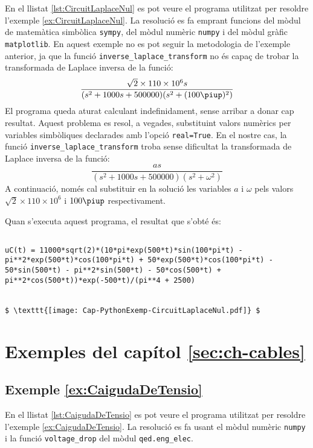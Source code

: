 En el llistat \vref{lst:CircuitLaplaceNul} es pot veure el programa utilitzat per resoldre l'exemple \vref{ex:CircuitLaplaceNul}. La resolució es fa emprant funcions del mòdul de matemàtica simbòlica \texttt{sympy}, del mòdul numèric \texttt{numpy} i del mòdul gràfic  \texttt{matplotlib}. 
En aquest exemple no es pot seguir la metodologia de l'exemple anterior, ja que la funció  \texttt{inverse\_laplace\_transform} no és capaç de trobar la transformada de Laplace inversa de la funció: 
\[
\frac{\sqrt{2}\times 110\times 10^6 s}{(s^2 + 1000 s + 500000)(s^2 + (100\piup)^2)}
\]
El programa queda aturat calculant indefinidament, sense arribar a donar cap resultat.  Aquest problema es resol, a vegades, substituint valors numèrics per variables simbòliques declarades amb l'opció \texttt{real=True}. En el nostre cas, la funció \texttt{inverse\_laplace\_transform} troba sense dificultat la transformada de Laplace inversa de la funció:
\[
\frac{a s}{(s^2 + 1000 s + 500000)(s^2 + \omega^2)}
\]
A continuació, només cal substituir en la solució les variables $a$ i $\omega$ pels valors $\sqrt{2}\times 110\times 10^6$ i $100\piup$ respectivament.





Quan s'executa aquest programa, el resultat que s'obté és:
\lstset{
	language=,
	numbers=none,
	frame=none
}
\begin{lstlisting}[mathescape=true]
	
uC(t) = 11000*sqrt(2)*(10*pi*exp(500*t)*sin(100*pi*t) - pi**2*exp(500*t)*cos(100*pi*t) + 50*exp(500*t)*cos(100*pi*t) - 50*sin(500*t) - pi**2*sin(500*t) - 50*cos(500*t) + pi**2*cos(500*t))*exp(-500*t)/(pi**4 + 2500)


$ \texttt{[image: Cap-PythonExemp-CircuitLaplaceNul.pdf]} $
\end{lstlisting} 



\section{Exemples del capítol \ref*{sec:ch-cables}}

\hypertarget{exemple:CaigudaDeTensio}{\subsection{Exemple \ref*{ex:CaigudaDeTensio} \CaigudaDeTensio}}
En el llistat \vref{lst:CaigudaDeTensio} es pot veure el programa utilitzat per resoldre l'exemple \vref{ex:CaigudaDeTensio}. La resolució es fa usant el mòdul numèric \texttt{numpy} i  la funció \texttt{voltage\_drop} del mòdul \texttt{qed.eng\_elec}.


